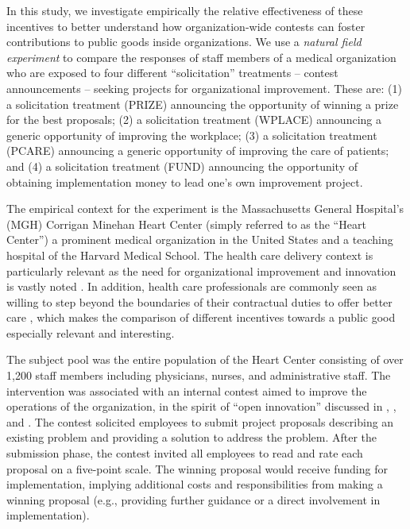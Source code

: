 \documentclass[12pt, titlepage]{article}
\begin{document}
In this study, we investigate empirically the relative effectiveness of
these incentives to better understand how organization-wide contests can
foster contributions to public goods inside organizations. We use a
\emph{natural field experiment} to compare the responses of staff
members of a medical organization who are exposed to four different
``solicitation'' treatments -- contest announcements -- seeking projects
for organizational improvement. These are: (1) a solicitation treatment
(PRIZE) announcing the opportunity of winning a prize for the best
proposals; (2) a solicitation treatment (WPLACE) announcing a generic
opportunity of improving the workplace; (3) a solicitation treatment
(PCARE) announcing a generic opportunity of improving the care of
patients; and (4) a solicitation treatment (FUND) announcing the
opportunity of obtaining implementation money to lead one's own
improvement project.

The empirical context for the experiment is the Massachusetts General
Hospital's (MGH) Corrigan Minehan Heart Center (simply referred to as
the ``Heart Center'') a prominent medical organization in the United
States and a teaching hospital of the Harvard Medical School. The health
care delivery context is particularly relevant as the need for
organizational improvement and innovation is vastly noted
\citep{cutler2012reducing}. In addition, health care professionals are
commonly seen as willing to step beyond the boundaries of their
contractual duties to offer better care \citep{delfgaauw2005dedicated},
which makes the comparison of different incentives towards a public good
especially relevant and interesting.

The subject pool was the entire population of the Heart Center
consisting of over 1,200 staff members including physicians, nurses, and
administrative staff. The intervention was associated with an internal
contest aimed to improve the operations of the organization, in the
spirit of ``open innovation'' discussed in
\citet{terwiesch2008innovation}, \citet{lakhani2013prize}, and
\citet{glaeser2016predictive}. The contest solicited employees to submit
project proposals describing an existing problem and providing a
solution to address the problem. After the submission phase, the contest
invited all employees to read and rate each proposal on a five-point
scale. The winning proposal would receive funding for implementation,
implying additional costs and responsibilities from making a winning
proposal (e.g., providing further guidance or a direct involvement in
implementation).
\end{document}
